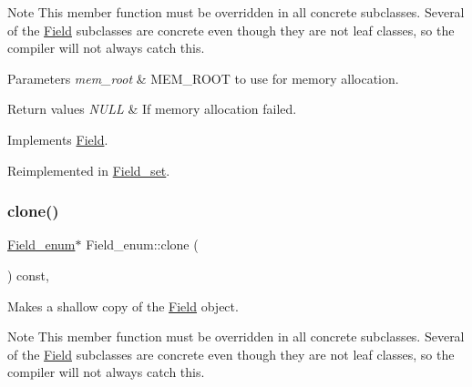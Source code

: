 \begin{DoxyNote}{Note}
This member function must be overridden in all concrete subclasses. Several of the \mbox{\hyperlink{classField}{Field}} subclasses are concrete even though they are not leaf classes, so the compiler will not always catch this.
\end{DoxyNote}

\begin{DoxyParams}{Parameters}
{\em mem\+\_\+root} & M\+E\+M\+\_\+\+R\+O\+OT to use for memory allocation. \\
\hline
\end{DoxyParams}

\begin{DoxyRetVals}{Return values}
{\em N\+U\+LL} & If memory allocation failed. \\
\hline
\end{DoxyRetVals}


Implements \mbox{\hyperlink{classField_a64979bcb9345803b031fff76a0c3d9fe}{Field}}.



Reimplemented in \mbox{\hyperlink{classField__set_a6fa7de649f03776a9047b06bc404cee4}{Field\+\_\+set}}.

\mbox{\label{classField__enum_a70a7230248a5c8c40751fe0f99f6d551}} 
\subsubsection{\texorpdfstring{clone()}{clone()}\hspace{0.1cm}{\footnotesize\ttfamily [2/2]}}
{\footnotesize\ttfamily \mbox{\hyperlink{classField__enum}{Field\+\_\+enum}}$\ast$ Field\+\_\+enum\+::clone (\begin{DoxyParamCaption}{ }\end{DoxyParamCaption}) const\hspace{0.3cm}{\ttfamily [inline]}, {\ttfamily [virtual]}}

Makes a shallow copy of the \mbox{\hyperlink{classField}{Field}} object.

\begin{DoxyNote}{Note}
This member function must be overridden in all concrete subclasses. Several of the \mbox{\hyperlink{classField}{Field}} subclasses are concrete even though they are not leaf classes, so the compiler will not always catch this.
\end{DoxyNote}

